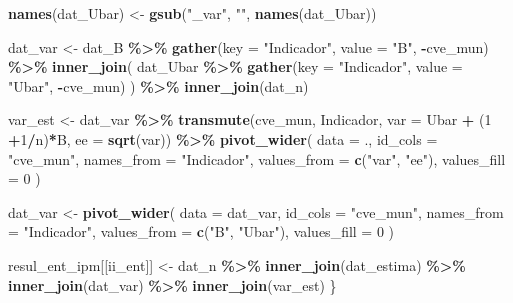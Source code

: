 \documentclass[
  12pt,
]{book}
\newenvironment{Shaded}{\begin{snugshade}}{\end{snugshade}}
\newcommand{\AttributeTok}[1]{\textcolor[rgb]{0.13,0.29,0.53}{#1}}
\newcommand{\DecValTok}[1]{\textcolor[rgb]{0.00,0.00,0.81}{#1}}
\newcommand{\FunctionTok}[1]{\textcolor[rgb]{0.13,0.29,0.53}{\textbf{#1}}}
\newcommand{\NormalTok}[1]{#1}
\newcommand{\OtherTok}[1]{\textcolor[rgb]{0.56,0.35,0.01}{#1}}
\newcommand{\SpecialCharTok}[1]{\textcolor[rgb]{0.81,0.36,0.00}{\textbf{#1}}}
\newcommand{\StringTok}[1]{\textcolor[rgb]{0.31,0.60,0.02}{#1}}
\begin{document}
\begin{Shaded}
\begin{Highlighting}[]
  \FunctionTok{names}\NormalTok{(dat\_Ubar) }\OtherTok{\textless{}{-}} \FunctionTok{gsub}\NormalTok{(}\StringTok{"\_var"}\NormalTok{, }\StringTok{""}\NormalTok{, }\FunctionTok{names}\NormalTok{(dat\_Ubar)) }

\NormalTok{  dat\_var }\OtherTok{\textless{}{-}}\NormalTok{ dat\_B }\SpecialCharTok{\%\textgreater{}\%} 
    \FunctionTok{gather}\NormalTok{(}\AttributeTok{key =} \StringTok{"Indicador"}\NormalTok{, }\AttributeTok{value =} \StringTok{"B"}\NormalTok{, }\SpecialCharTok{{-}}\NormalTok{cve\_mun) }\SpecialCharTok{\%\textgreater{}\%}
    \FunctionTok{inner\_join}\NormalTok{(}
\NormalTok{      dat\_Ubar }\SpecialCharTok{\%\textgreater{}\%} \FunctionTok{gather}\NormalTok{(}\AttributeTok{key =} \StringTok{"Indicador"}\NormalTok{, }\AttributeTok{value =} \StringTok{"Ubar"}\NormalTok{, }\SpecialCharTok{{-}}\NormalTok{cve\_mun)}
\NormalTok{    ) }\SpecialCharTok{\%\textgreater{}\%} \FunctionTok{inner\_join}\NormalTok{(dat\_n)}

\NormalTok{  var\_est }\OtherTok{\textless{}{-}}\NormalTok{  dat\_var }\SpecialCharTok{\%\textgreater{}\%} 
    \FunctionTok{transmute}\NormalTok{(cve\_mun, Indicador,}
              \AttributeTok{var =}\NormalTok{ Ubar }\SpecialCharTok{+}\NormalTok{ (}\DecValTok{1} \SpecialCharTok{+}\DecValTok{1}\SpecialCharTok{/}\NormalTok{n)}\SpecialCharTok{*}\NormalTok{B,}
              \AttributeTok{ee =} \FunctionTok{sqrt}\NormalTok{(var)) }\SpecialCharTok{\%\textgreater{}\%} 
    \FunctionTok{pivot\_wider}\NormalTok{(}
      \AttributeTok{data =}\NormalTok{ .,}
      \AttributeTok{id\_cols =} \StringTok{"cve\_mun"}\NormalTok{,}
      \AttributeTok{names\_from =} \StringTok{"Indicador"}\NormalTok{,}
      \AttributeTok{values\_from =} \FunctionTok{c}\NormalTok{(}\StringTok{"var"}\NormalTok{, }\StringTok{"ee"}\NormalTok{), }\AttributeTok{values\_fill =} \DecValTok{0}
\NormalTok{    ) }

\NormalTok{  dat\_var }\OtherTok{\textless{}{-}} \FunctionTok{pivot\_wider}\NormalTok{(}
    \AttributeTok{data =}\NormalTok{ dat\_var,}
    \AttributeTok{id\_cols =} \StringTok{"cve\_mun"}\NormalTok{,}
    \AttributeTok{names\_from =} \StringTok{"Indicador"}\NormalTok{,}
    \AttributeTok{values\_from =} \FunctionTok{c}\NormalTok{(}\StringTok{"B"}\NormalTok{, }\StringTok{"Ubar"}\NormalTok{), }\AttributeTok{values\_fill =} \DecValTok{0}
\NormalTok{  ) }

\NormalTok{  resul\_ent\_ipm[[ii\_ent]] }\OtherTok{\textless{}{-}}\NormalTok{ dat\_n }\SpecialCharTok{\%\textgreater{}\%} \FunctionTok{inner\_join}\NormalTok{(dat\_estima) }\SpecialCharTok{\%\textgreater{}\%}
    \FunctionTok{inner\_join}\NormalTok{(dat\_var) }\SpecialCharTok{\%\textgreater{}\%}
    \FunctionTok{inner\_join}\NormalTok{(var\_est)}
\NormalTok{\}}
\end{Highlighting}
\end{Shaded}
\end{document}
